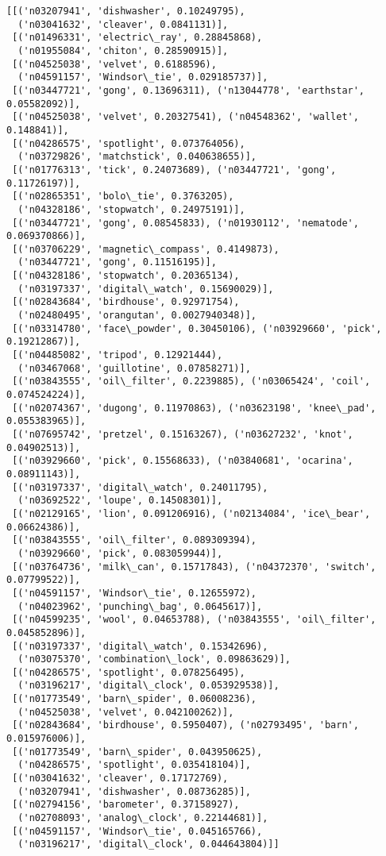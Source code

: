 \documentclass[11pt]{article}
\makeatletter
\newcommand{\boxspacing}{\kern\kvtcb@left@rule\kern\kvtcb@boxsep}
\newcommand{\prompt}[4]{
        {\ttfamily\llap{{\color{#2}[#3]:\hspace{3pt}#4}}\vspace{-\baselineskip}}
    }
\makeatother
\begin{document}
            \begin{tcolorbox}[breakable, size=fbox, boxrule=.5pt, pad at break*=1mm, opacityfill=0]
\prompt{Out}{outcolor}{13}{\boxspacing}
\begin{Verbatim}[commandchars=\\\{\}]
[[('n03207941', 'dishwasher', 0.10249795),
  ('n03041632', 'cleaver', 0.0841131)],
 [('n01496331', 'electric\_ray', 0.28845868),
  ('n01955084', 'chiton', 0.28590915)],
 [('n04525038', 'velvet', 0.6188596),
  ('n04591157', 'Windsor\_tie', 0.029185737)],
 [('n03447721', 'gong', 0.13696311), ('n13044778', 'earthstar', 0.05582092)],
 [('n04525038', 'velvet', 0.20327541), ('n04548362', 'wallet', 0.148841)],
 [('n04286575', 'spotlight', 0.073764056),
  ('n03729826', 'matchstick', 0.040638655)],
 [('n01776313', 'tick', 0.24073689), ('n03447721', 'gong', 0.11726197)],
 [('n02865351', 'bolo\_tie', 0.3763205),
  ('n04328186', 'stopwatch', 0.24975191)],
 [('n03447721', 'gong', 0.08545833), ('n01930112', 'nematode', 0.069370866)],
 [('n03706229', 'magnetic\_compass', 0.4149873),
  ('n03447721', 'gong', 0.11516195)],
 [('n04328186', 'stopwatch', 0.20365134),
  ('n03197337', 'digital\_watch', 0.15690029)],
 [('n02843684', 'birdhouse', 0.92971754),
  ('n02480495', 'orangutan', 0.0027940348)],
 [('n03314780', 'face\_powder', 0.30450106), ('n03929660', 'pick', 0.19212867)],
 [('n04485082', 'tripod', 0.12921444),
  ('n03467068', 'guillotine', 0.07858271)],
 [('n03843555', 'oil\_filter', 0.2239885), ('n03065424', 'coil', 0.074524224)],
 [('n02074367', 'dugong', 0.11970863), ('n03623198', 'knee\_pad', 0.055383965)],
 [('n07695742', 'pretzel', 0.15163267), ('n03627232', 'knot', 0.04902513)],
 [('n03929660', 'pick', 0.15568633), ('n03840681', 'ocarina', 0.08911143)],
 [('n03197337', 'digital\_watch', 0.24011795),
  ('n03692522', 'loupe', 0.14508301)],
 [('n02129165', 'lion', 0.091206916), ('n02134084', 'ice\_bear', 0.06624386)],
 [('n03843555', 'oil\_filter', 0.089309394),
  ('n03929660', 'pick', 0.083059944)],
 [('n03764736', 'milk\_can', 0.15717843), ('n04372370', 'switch', 0.07799522)],
 [('n04591157', 'Windsor\_tie', 0.12655972),
  ('n04023962', 'punching\_bag', 0.0645617)],
 [('n04599235', 'wool', 0.04653788), ('n03843555', 'oil\_filter', 0.045852896)],
 [('n03197337', 'digital\_watch', 0.15342696),
  ('n03075370', 'combination\_lock', 0.09863629)],
 [('n04286575', 'spotlight', 0.078256495),
  ('n03196217', 'digital\_clock', 0.053929538)],
 [('n01773549', 'barn\_spider', 0.06008236),
  ('n04525038', 'velvet', 0.042100262)],
 [('n02843684', 'birdhouse', 0.5950407), ('n02793495', 'barn', 0.015976006)],
 [('n01773549', 'barn\_spider', 0.043950625),
  ('n04286575', 'spotlight', 0.035418104)],
 [('n03041632', 'cleaver', 0.17172769),
  ('n03207941', 'dishwasher', 0.08736285)],
 [('n02794156', 'barometer', 0.37158927),
  ('n02708093', 'analog\_clock', 0.22144681)],
 [('n04591157', 'Windsor\_tie', 0.045165766),
  ('n03196217', 'digital\_clock', 0.044643804)]]
\end{Verbatim}
\end{tcolorbox}
        
\end{document}
